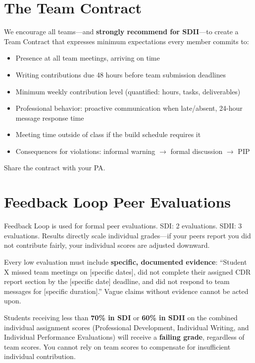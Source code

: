 \section{The Team Contract}
We encourage all teams---and \textbf{strongly recommend for SDII}---to create a Team Contract that expresses minimum expectations every member commits to:
\begin{itemize}[nosep,leftmargin=1.5em]
\item Presence at all team meetings, arriving on time
\item Writing contributions due 48 hours before team submission deadlines
\item Minimum weekly contribution level (quantified: hours, tasks, deliverables)
\item Professional behavior: proactive communication when late/absent, 24-hour message response time
\item Meeting time outside of class if the build schedule requires it
\item Consequences for violations: informal warning $\to$ formal discussion $\to$ PIP
\end{itemize}
Share the contract with your PA.

\section{Feedback Loop Peer Evaluations}
Feedback Loop is used for formal peer evaluations. SDI: 2 evaluations. SDII: 3 evaluations. Results directly scale individual grades---if your peers report you did not contribute fairly, your individual scores are adjusted downward.

Every low evaluation must include \textbf{specific, documented evidence}: ``Student X missed team meetings on [specific dates], did not complete their assigned CDR report section by the [specific date] deadline, and did not respond to team messages for [specific duration].'' Vague claims without evidence cannot be acted upon.

\begin{warningbox}
Students receiving less than \textbf{70\% in SDI} or \textbf{60\% in SDII} on the combined individual assignment scores (Professional Development, Individual Writing, and Individual Performance Evaluations) will receive a \textbf{failing grade}, regardless of team scores. You cannot rely on team scores to compensate for insufficient individual contribution.
\end{warningbox}

